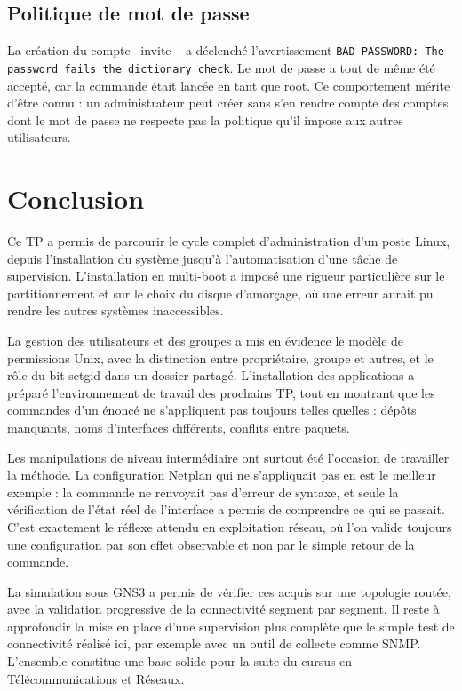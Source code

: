 \documentclass[11pt,a4paper]{article}
\providecommand{\og}{\leavevmode\guillemotleft{}~}
\providecommand{\fg}{\unskip~\guillemotright{}}
\begin{document}
\subsection{Politique de mot de passe}

La cr\'eation du compte \og invite \fg{} a d\'eclench\'e l'avertissement
\texttt{BAD PASSWORD: The password fails the dictionary check}. Le mot de passe a tout de m\^eme \'et\'e
accept\'e, car la commande \'etait lanc\'ee en tant que root. Ce comportement m\'erite d'\^etre connu : un
administrateur peut cr\'eer sans s'en rendre compte des comptes dont le mot de passe ne respecte pas la
politique qu'il impose aux autres utilisateurs.

\section{Conclusion}

Ce TP a permis de parcourir le cycle complet d'administration d'un poste Linux, depuis l'installation du
syst\`eme jusqu'\`a l'automatisation d'une t\^ache de supervision. L'installation en multi-boot a impos\'e
une rigueur particuli\`ere sur le partitionnement et sur le choix du disque d'amor\c{c}age, o\`u une erreur
aurait pu rendre les autres syst\`emes inaccessibles.

La gestion des utilisateurs et des groupes a mis en \'evidence le mod\`ele de permissions Unix, avec la
distinction entre propri\'etaire, groupe et autres, et le r\^ole du bit setgid dans un dossier partag\'e.
L'installation des applications a pr\'epar\'e l'environnement de travail des prochains TP, tout en montrant
que les commandes d'un \'enonc\'e ne s'appliquent pas toujours telles quelles : d\'ep\^ots manquants, noms
d'interfaces diff\'erents, conflits entre paquets.

Les manipulations de niveau interm\'ediaire ont surtout \'et\'e l'occasion de travailler la m\'ethode. La
configuration Netplan qui ne s'appliquait pas en est le meilleur exemple : la commande ne renvoyait pas
d'erreur de syntaxe, et seule la v\'erification de l'\'etat r\'eel de l'interface a permis de comprendre ce
qui se passait. C'est exactement le r\'eflexe attendu en exploitation r\'eseau, o\`u l'on valide toujours une
configuration par son effet observable et non par le simple retour de la commande.

La simulation sous GNS3 a permis de v\'erifier ces acquis sur une topologie rout\'ee, avec la validation
progressive de la connectivit\'e segment par segment. Il reste \`a approfondir la mise en place d'une
supervision plus compl\`ete que le simple test de connectivit\'e r\'ealis\'e ici, par exemple avec un
outil de collecte comme SNMP. L'ensemble constitue une base solide pour la suite du cursus en
T\'el\'ecommunications et R\'eseaux.
\end{document}
